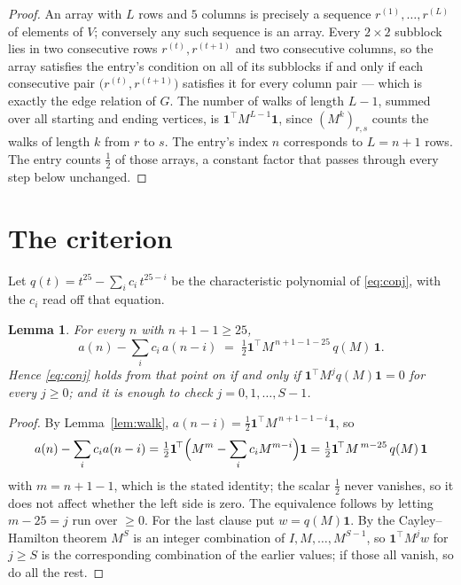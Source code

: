 \documentclass[11pt,a4paper]{article}
\theoremstyle{plain}
\newtheorem{lemma}[theorem]{Lemma}
\theoremstyle{definition}
\begin{document}
\begin{proof}
An array with $L$ rows and $5$ columns is precisely a sequence
$r^{(1)},\dots,r^{(L)}$ of elements of $V$; conversely any such sequence is an array.
Every $2\times2$ subblock lies in two consecutive rows $r^{(t)},r^{(t+1)}$ and two
consecutive columns, so the array satisfies the entry's condition on all of its subblocks
if and only if each consecutive pair $\bigl(r^{(t)},r^{(t+1)}\bigr)$ satisfies it for
every column pair --- which is exactly the edge relation of $G$. The number of walks of
length $L-1$, summed over all starting and ending vertices, is
$\mathbf{1}^{\!\top}M^{L-1}\mathbf{1}$, since $(M^{k})_{r,s}$ counts the walks of
length $k$ from $r$ to $s$. The entry's index $n$ corresponds to $L=n+1$ rows. The entry counts $\tfrac1{2}$ of those arrays, a constant factor that passes through every step below unchanged.
\end{proof}

\section{The criterion}

Let $q(t)=t^{25}-\sum_i c_i\,t^{25-i}$ be the characteristic polynomial of
\eqref{eq:conj}, with the $c_i$ read off that equation.

\begin{lemma}\label{lem:crit}
For every $n$ with $n+1-1\ge25$,
\[
a(n)-\sum_i c_i\,a(n-i)\;=\;\tfrac1{2}\mathbf{1}^{\!\top}M^{\,n+1-1-25}\,q(M)\,\mathbf{1} .
\]
Hence \eqref{eq:conj} holds from that point on if and only if
$\mathbf{1}^{\!\top}M^{j}q(M)\mathbf{1}=0$ for every $j\ge0$; and it is enough to check
$j=0,1,\dots,S-1$.
\end{lemma}

\begin{proof}
By Lemma~\ref{lem:walk}, $a(n-i)=\tfrac1{2}\mathbf{1}^{\!\top}M^{\,n+1-1-i}\mathbf{1}$, so
\[
a(n)-\sum_i c_i a(n-i)
=\tfrac1{2}\mathbf{1}^{\!\top}\Bigl(M^{m}-\sum_i c_i M^{m-i}\Bigr)\mathbf{1}
=\tfrac1{2}\mathbf{1}^{\!\top}M^{\,m-25}\,q(M)\,\mathbf{1}
\]
with $m=n+1-1$, which is the stated identity; the scalar $\tfrac1{2}$ never vanishes, so
it does not affect whether the left side is zero. The equivalence follows by letting
$m-25=j$ run over $\ge0$. For the last clause put $w=q(M)\mathbf{1}$. By the
Cayley--Hamilton theorem $M^{S}$ is an integer combination of $I,M,\dots,M^{S-1}$, so
$\mathbf{1}^{\!\top}M^{j}w$ for $j\ge S$ is the corresponding combination of the earlier
values; if those all vanish, so do all the rest.
\end{proof}
\end{document}
